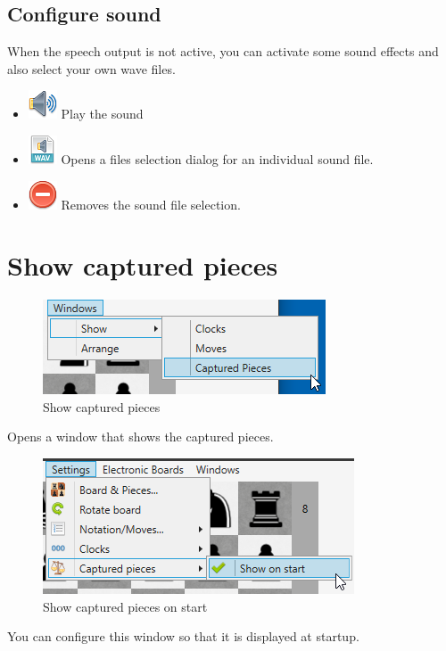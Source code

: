 \documentclass[11pt,a4paper]{article}
\begin{document}
	\subsection{Configure sound}
	
	When the speech output is not active, you can activate some sound effects and also select your own wave files.
	
	\begin{itemize}
		\item \includegraphics[scale=0.5]{sound.png} Play the sound
		\item \includegraphics[scale=0.5]{file_extension_wav.png} Opens a files selection dialog for an individual sound file.
		\item \includegraphics[scale=0.5]{delete.png} Removes the sound file selection.
	\end{itemize}
	
	
	\section{Show captured pieces}
	\begin{figure}[H]
		\centering
		\includegraphics[scale=1.0]{CapturedPieces1.png}
		\caption{Show captured pieces }
		\label{fig:CapturedPieces1}
	\end{figure}
	
	Opens a window that shows the captured pieces.
	\begin{figure}[H]
		\centering
		\includegraphics[scale=1.0]{CapturedPieces2.png}
		\caption{Show captured pieces on start }
		\label{fig:CapturedPieces2}
	\end{figure}
	You can configure this window so that it is displayed at startup.
	
\end{document}
